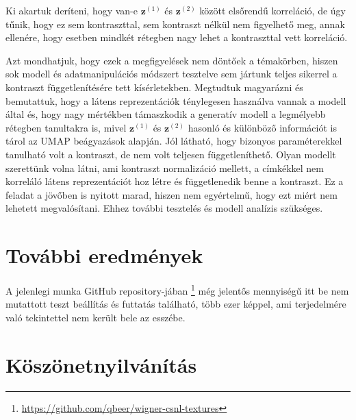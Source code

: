 \documentclass[12pt, english]{article}
\begin{document}
\par Ki akartuk deríteni, hogy van-e $\bm{z}^{(1)}$ és $\bm{z}^{(2)}$ között elsőrendű korreláció, de úgy tűnik, hogy ez sem kontraszttal, sem kontraszt nélkül nem figyelhető meg, annak ellenére, hogy esetben mindkét rétegben nagy lehet a kontraszttal vett korreláció.

\vspace{4mm}

\par Azt mondhatjuk, hogy ezek a megfigyelések nem döntőek a témakörben, hiszen sok modell és adatmanipulációs módszert tesztelve sem jártunk teljes sikerrel a kontraszt függetlenítésére tett kísérletekben. Megtudtuk magyarázni és bemutattuk, hogy a látens reprezentációk ténylegesen használva vannak a modell által és, hogy nagy mértékben támaszkodik a generatív modell a legmélyebb rétegben tanultakra is, mivel  $\bm{z}^{(1)}$ és $\bm{z}^{(2)}$ hasonló és különböző információt is tárol az UMAP beágyazások alapján. Jól látható, hogy bizonyos paraméterekkel tanulható volt a kontraszt, de nem volt teljesen függetleníthető. Olyan modellt szerettünk volna látni, ami kontraszt normalizáció mellett, a címkékkel nem korreláló látens reprezentációt hoz létre és függetlenedik benne a kontraszt. Ez a feladat a jövőben is nyitott marad, hiszen nem egyértelmű, hogy ezt miért nem lehetett megvalósítani. Ehhez további tesztelés és modell analízis szükséges.

\vspace{7mm}

\section{További eredmények}

\vspace{7mm}

\par A jelenlegi munka GitHub repository-jában \footnote{\url{https://github.com/qbeer/wigner-csnl-textures}} még jelentős mennyiségű itt be nem mutattott teszt beállítás és futtatás található, több ezer képpel, ami terjedelmére való tekintettel nem került bele az esszébe.

\vspace{7mm}

\section{Köszönetnyilvánítás}

\vspace{7mm}
\end{document}
